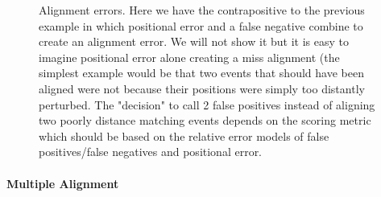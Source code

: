 \documentclass[11pt]{article}
\begin{document}
\begin{figure}[h!]

\begin{center}
 \caption{Alignment errors.  Here we have the contrapositive to the previous example in which positional error and a false negative combine to create an alignment error.  We will not show it but it is easy to imagine positional error alone creating a miss alignment (the simplest example would be that two events that should have been aligned were not because their positions were simply too distantly perturbed.  The "decision" to call 2 false positives instead of aligning two poorly distance matching events depends on the scoring metric which should be based on the relative error models of false positives/false negatives and positional error.}
\end{center}
\end{figure}

\paragraph{\newline Multiple Alignment\newline}
\end{document}
